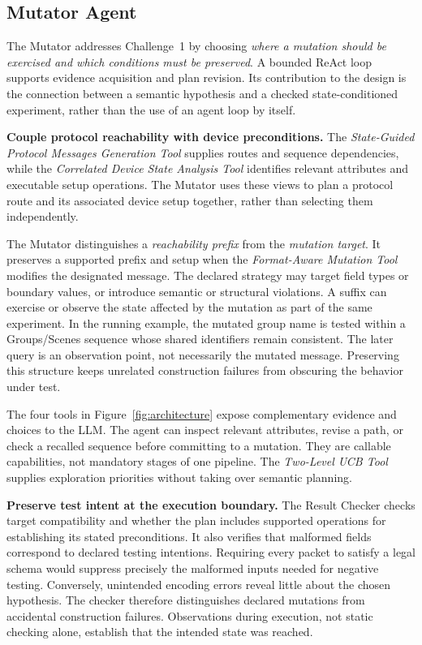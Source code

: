 \documentclass[10pt,journal,compsoc]{IEEEtran}
\newcommand{\parab}[1]{\vspace{0.04in}\noindent\textbf{#1}}
\begin{document}
\subsection{Mutator Agent}\label{sec:mutator}
The Mutator addresses Challenge~1 by choosing \emph{where a mutation should be exercised and which conditions must be preserved}. A bounded ReAct loop~\cite{react} supports evidence acquisition and plan revision. Its contribution to the design is the connection between a semantic hypothesis and a checked state-conditioned experiment, rather than the use of an agent loop by itself.

\parab{Couple protocol reachability with device preconditions.}
The \emph{State-Guided Protocol Messages Generation Tool} supplies routes and sequence dependencies, while the \emph{Correlated Device State Analysis Tool} identifies relevant attributes and executable setup operations. The Mutator uses these views to plan a protocol route and its associated device setup together, rather than selecting them independently.

The Mutator distinguishes a \emph{reachability prefix} from the \emph{mutation target}. It preserves a supported prefix and setup when the \emph{Format-Aware Mutation Tool} modifies the designated message. The declared strategy may target field types or boundary values, or introduce semantic or structural violations. A suffix can exercise or observe the state affected by the mutation as part of the same experiment. In the running example, the mutated group name is tested within a Groups/Scenes sequence whose shared identifiers remain consistent. The later query is an observation point, not necessarily the mutated message. Preserving this structure keeps unrelated construction failures from obscuring the behavior under test.

The four tools in Figure~\ref{fig:architecture} expose complementary evidence and choices to the LLM. The agent can inspect relevant attributes, revise a path, or check a recalled sequence before committing to a mutation. They are callable capabilities, not mandatory stages of one pipeline. The \emph{Two-Level UCB Tool} supplies exploration priorities without taking over semantic planning.

\parab{Preserve test intent at the execution boundary.}
The Result Checker checks target compatibility and whether the plan includes supported operations for establishing its stated preconditions. It also verifies that malformed fields correspond to declared testing intentions. Requiring every packet to satisfy a legal schema would suppress precisely the malformed inputs needed for negative testing. Conversely, unintended encoding errors reveal little about the chosen hypothesis. The checker therefore distinguishes declared mutations from accidental construction failures. Observations during execution, not static checking alone, establish that the intended state was reached.
\end{document}
